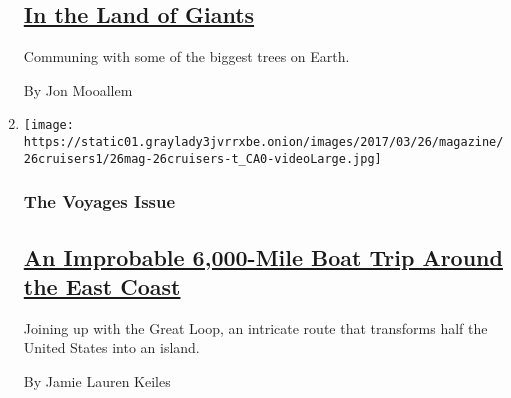 \begin{enumerate}
  \hypertarget{in-the-land-of-giants}{%
  \subsection{\texorpdfstring{\href{/2017/03/23/magazine/sequoias-in-the-land-of-giants.html}{In
  the Land of
  Giants}}{In the Land of Giants}}\label{in-the-land-of-giants}}

  Communing with some of the biggest trees on Earth.

  By Jon Mooallem
\item
  \texttt{[image: https://static01.graylady3jvrrxbe.onion/images/2017/03/26/magazine/26cruisers1/26mag-26cruisers-t\_CA0-videoLarge.jpg]}

  \hypertarget{the-voyages-issue-5}{%
  \subsubsection{The Voyages Issue}\label{the-voyages-issue-5}}

  \hypertarget{an-improbable-6000-mile-boat-trip-around-the-east-coast}{%
  \subsection{\texorpdfstring{\href{/2017/03/22/magazine/an-improbable-6000-mile-boat-trip-around-the-east-coast.html}{An
  Improbable 6,000-Mile Boat Trip Around the East
  Coast}}{An Improbable 6,000-Mile Boat Trip Around the East Coast}}\label{an-improbable-6000-mile-boat-trip-around-the-east-coast}}

  Joining up with the Great Loop, an intricate route that transforms
  half the United States into an island.

  By Jamie Lauren Keiles
\end{enumerate}

